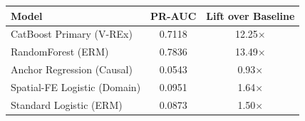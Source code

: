 \begin{tabular}{lcc}
\toprule
\textbf{Model} & \textbf{PR-AUC} & \textbf{Lift over Baseline} \\
\midrule
CatBoost Primary (V-REx) & 0.7118 & 12.25$\times$ \\
RandomForest (ERM) & 0.7836 & 13.49$\times$ \\
Anchor Regression (Causal) & 0.0543 & 0.93$\times$ \\
Spatial-FE Logistic (Domain) & 0.0951 & 1.64$\times$ \\
Standard Logistic (ERM) & 0.0873 & 1.50$\times$ \\
\bottomrule
\end{tabular}
